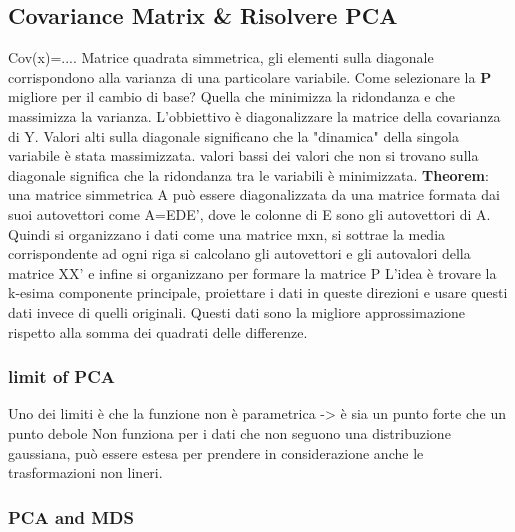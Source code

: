 \subsection{Covariance Matrix \& Risolvere PCA}
Cov(x)=....
Matrice quadrata simmetrica, gli elementi sulla diagonale corrispondono alla varianza di una particolare variabile.
Come selezionare la \textbf{P} migliore per il cambio di base?
Quella che minimizza la ridondanza e che massimizza la varianza.
L'obbiettivo è diagonalizzare la matrice della covarianza di Y.
Valori alti sulla diagonale significano che la "dinamica" della singola variabile è stata massimizzata.
valori bassi dei valori che non si trovano sulla diagonale significa che la ridondanza tra le variabili è minimizzata.
\textbf{Theorem}: una matrice simmetrica A può essere diagonalizzata da una matrice formata dai suoi autovettori
come A=EDE', dove le colonne di E sono gli autovettori di A.
Quindi si organizzano i dati come una matrice mxn, si sottrae la media corrispondente ad ogni riga
si calcolano gli autovettori e gli autovalori della matrice XX'
e infine si organizzano per formare la matrice P
L'idea è trovare la k-esima componente principale, proiettare i dati in queste direzioni e usare questi dati invece di quelli originali.
Questi dati sono la migliore approssimazione rispetto alla somma dei quadrati delle differenze.
\subsubsection{limit of PCA}
Uno dei limiti è che la funzione non è parametrica -> è sia un punto forte che un punto debole
Non funziona per i dati che non seguono una distribuzione gaussiana, può essere estesa per prendere in considerazione anche le trasformazioni non lineri.
\subsubsection{PCA and MDS}
